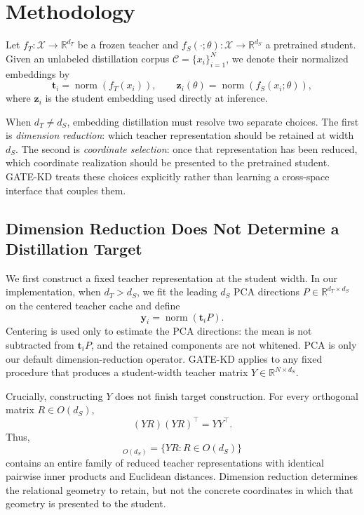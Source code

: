 \section{Methodology}
\label{sec:method}

Let $f_T:\mathcal{X}\rightarrow\mathbb{R}^{d_T}$ be a frozen teacher and
$f_S(\cdot;\theta):\mathcal{X}\rightarrow\mathbb{R}^{d_S}$ a pretrained
student. Given an unlabeled distillation corpus
$\mathcal{C}=\{x_i\}_{i=1}^{N}$, we denote their normalized embeddings by
\begin{equation}
    \mathbf{t}_i=\operatorname{norm}\!\left(f_T(x_i)\right),
    \qquad
    \mathbf{z}_i(\theta)=\operatorname{norm}\!\left(f_S(x_i;\theta)\right),
    \label{eq:normalized-embeddings}
\end{equation}
where $\mathbf{z}_i$ is the student embedding used directly at inference.

When $d_T\neq d_S$, embedding distillation must resolve two separate choices.
The first is \emph{dimension reduction}: which teacher representation should be
retained at width $d_S$. The second is \emph{coordinate selection}: once that
representation has been reduced, which coordinate realization should be
presented to the pretrained student. GATE-KD treats these choices explicitly
rather than learning a cross-space interface that couples them.

\subsection{Dimension Reduction Does Not Determine a Distillation Target}
\label{sec:dimension-reduction}

We first construct a fixed teacher representation at the student width. In our
implementation, when $d_T>d_S$, we fit the leading $d_S$ PCA directions
$P\in\mathbb{R}^{d_T\times d_S}$ on the centered teacher cache and define
\begin{equation}
    \mathbf{y}_i=\operatorname{norm}\!\left(\mathbf{t}_iP\right).
    \label{eq:reduced-target}
\end{equation}
Centering is used only to estimate the PCA directions: the mean is not
subtracted from $\mathbf{t}_iP$, and the retained components are not whitened.
PCA is only our default dimension-reduction operator. GATE-KD applies to any
fixed procedure that produces a student-width teacher matrix
$Y\in\mathbb{R}^{N\times d_S}$.

Crucially, constructing $Y$ does not finish target construction. For every
orthogonal matrix $R\in O(d_S)$,
\begin{equation}
    (YR)(YR)^\top=YY^\top.
    \label{eq:gram-invariance}
\end{equation}
Thus,
\begin{equation}
    [Y]_{O(d_S)}=\{YR:R\in O(d_S)\}
    \label{eq:target-orbit}
\end{equation}
contains an entire family of reduced teacher representations with identical
pairwise inner products and Euclidean distances. Dimension reduction determines
the relational geometry to retain, but not the concrete coordinates in which
that geometry is presented to the student.

